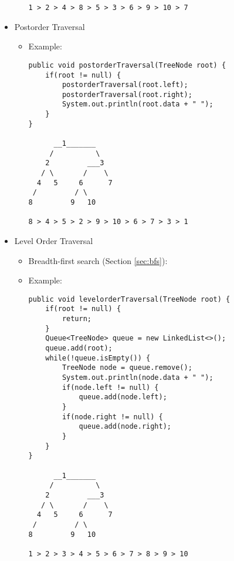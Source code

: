 \documentclass[a4paper, 11.25pt]{article}
\begin{document}
\begin{itemize}
\begin{itemize}
\begin{lstlisting}[style=CStyle]
1 > 2 > 4 > 8 > 5 > 3 > 6 > 9 > 10 > 7\end{lstlisting}
        \end{itemize}
        \item Postorder Traversal
        \begin{itemize}
        \item Example:
        \begin{lstlisting}[style=CStyle]
public void postorderTraversal(TreeNode root) {
    if(root != null) {
        postorderTraversal(root.left);
        postorderTraversal(root.right);
        System.out.println(root.data + " ");
    }
}
    
      __1_______
     /          \
    2         ___3
   / \       /    \
  4   5     6      7
 /         / \
8         9   10

8 > 4 > 5 > 2 > 9 > 10 > 6 > 7 > 3 > 1\end{lstlisting}
        \end{itemize}
        \item Level Order Traversal
        \begin{itemize}
        \item Breadth-first search (Section \ref{sec:bfs}):
        \item Example:
        \begin{lstlisting}[style=CStyle]
public void levelorderTraversal(TreeNode root) {
    if(root != null) {
        return;
    }
    Queue<TreeNode> queue = new LinkedList<>();
    queue.add(root);
    while(!queue.isEmpty()) {
        TreeNode node = queue.remove();
        System.out.println(node.data + " "); 
        if(node.left != null) {
            queue.add(node.left);
        }
        if(node.right != null) {
            queue.add(node.right);
        }
    }
}
    
      __1_______
     /          \
    2         ___3
   / \       /    \
  4   5     6      7
 /         / \
8         9   10

1 > 2 > 3 > 4 > 5 > 6 > 7 > 8 > 9 > 10\end{lstlisting}
        \end{itemize}
\end{itemize}
\end{document}
